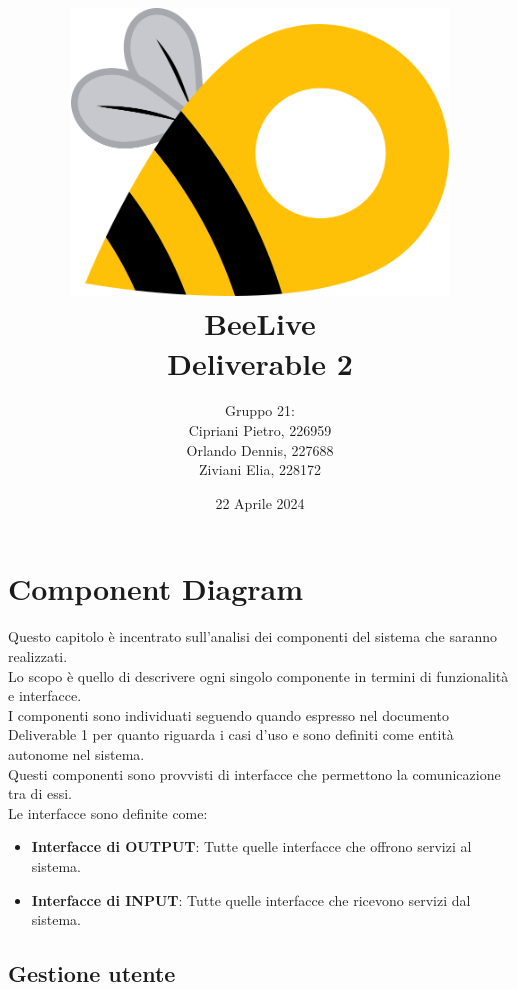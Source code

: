 \documentclass{article}
\title{\includegraphics[width=0.75\textwidth]{Images/BeeLive-Logo.png}\\\vspace{100pt}
\LARGE{\textbf{BeeLive\\Deliverable 2}}}
\author{Gruppo 21:\\
Cipriani Pietro, 226959\\
Orlando Dennis, 227688\\
Ziviani Elia, 228172}
\date{22 Aprile 2024}
\begin{document}
\maketitle
\thispagestyle{firstpage} %
\clearpage

\pagestyle{nonplain} %

\renewcommand{\contentsname}{Indice}
\tableofcontents

\clearpage

\section{Component Diagram}

Questo capitolo è incentrato sull'analisi dei componenti del sistema che saranno realizzati.\\
Lo scopo è quello di descrivere ogni singolo componente in termini di funzionalità e interfacce.\\

I componenti sono individuati seguendo quando espresso nel documento Deliverable 1 per quanto riguarda i casi d'uso e sono definiti come entità autonome nel sistema.\\
Questi componenti sono provvisti di interfacce che permettono la comunicazione tra di essi.\\
Le interfacce sono definite come:
\begin{itemize}
    \item \textbf{Interfacce di OUTPUT}: Tutte quelle interfacce che offrono servizi al sistema.
    \item \textbf{Interfacce di INPUT}: Tutte quelle interfacce che ricevono servizi dal sistema.
\end{itemize} 

\subsection{Gestione utente}
\end{document}
